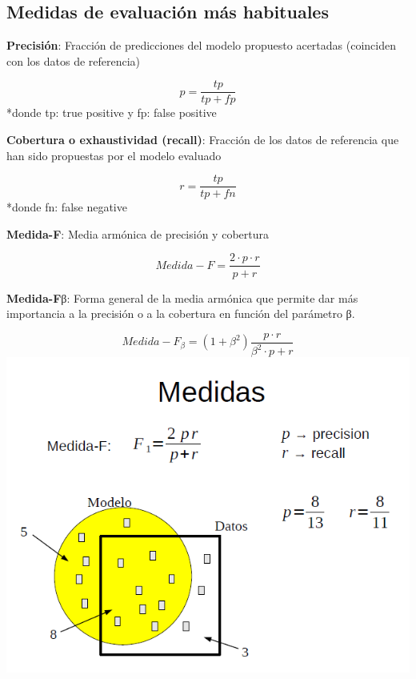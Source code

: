 \documentclass{ctexart}
\begin{document}
	\subsection{Medidas de evaluación más habituales}
	\begin{flushleft}
		\textbf{Precisión}: Fracción de predicciones del modelo propuesto acertadas (coinciden con los datos de referencia)\par
		\begin{displaymath}
		p = \frac{tp}{tp+fp} 
		\end{displaymath}
		*donde tp: true positive y fp: false positive\par
		\textbf{Cobertura o exhaustividad (recall)}: Fracción de los datos de referencia que han sido propuestas por el modelo evaluado\par
		\begin{displaymath}
		r = \frac{tp}{tp+fn} 
		\end{displaymath}
		*donde fn: false negative\par
		\textbf{Medida-F}: Media armónica de precisión y cobertura\par
		\begin{displaymath}
		Medida-F = \frac{2 \cdot p \cdot r}{p+r} 
		\end{displaymath}\par
		\textbf{Medida-F}β: Forma general de la media armónica que permite dar más importancia a la precisión o a la cobertura en función del parámetro β. \par
		\begin{displaymath}
		Medida-F_{\beta}  = (1+\beta^2) \frac{p \cdot r}{\beta^2 \cdot p + r} 
		\end{displaymath}
		\includegraphics[scale=0.75]{medidas}
	\end{flushleft}
\end{document}
